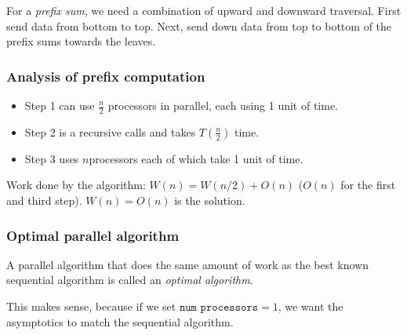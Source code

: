 For a \textit{prefix sum}, we need a combination of upward and downward traversal.
First send data from bottom to top. Next, send down data from top to bottom
of the prefix sums towards the leaves.

\subsubsection{Analysis of prefix computation}
\begin{itemize}
    \item Step 1 can use $\frac{n}{2}$ processors in parallel, each using 1 unit
        of time.

    \item Step 2 is a recursive calls and takes $T(\frac{n}{2})$ time.

    \item Step 3 uses $n$processors each of which take 1 unit of time.
\end{itemize}

Work done by the algorithm: $W(n) = W(n/2) + O(n)$ ($O(n)$ for the first
and third step).
$W(n) = O(n)$ is the solution.

\subsubsection{Optimal parallel algorithm}
A parallel algorithm that does the same amount of work
as the best known sequential algorithm is called an \textit{optimal algorithm}.

This makes sense, because if we set $\texttt{num processors} = 1$, we want the asymptotics
to match the sequential algorithm.


